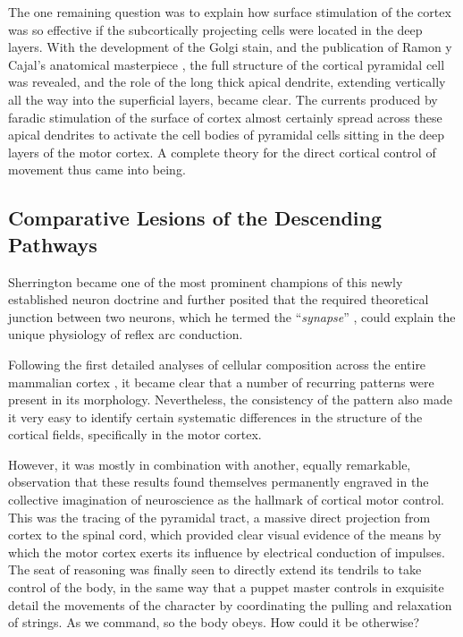The one remaining question was to explain how surface stimulation of the cortex was so effective if the subcortically projecting cells were located in the deep layers. With the development of the Golgi stain, and the publication of Ramon y Cajal's anatomical masterpiece \cite{RamonYCajal1894}, the full structure of the cortical pyramidal cell was revealed, and the role of the long thick apical dendrite, extending vertically all the way into the superficial layers, became clear. The currents produced by faradic stimulation of the surface of cortex almost certainly spread across these apical dendrites to activate the cell bodies of pyramidal cells sitting in the deep layers of the motor cortex. A complete theory for the direct cortical control of movement thus came into being.

\subsection{Comparative Lesions of the Descending Pathways}



Sherrington became one of the most prominent champions of this newly established neuron doctrine and further posited that the required theoretical junction between two neurons, which he termed the ``\emph{synapse}'' \cite{Foster1897}, could explain the unique physiology of reflex arc conduction.

Following the first detailed analyses of cellular composition across the entire mammalian cortex \cite{Campbell1905,Brodmann1909}, it became clear that a number of recurring patterns were present in its morphology. Nevertheless, the consistency of the pattern also made it very easy to identify certain systematic differences in the structure of the cortical fields, specifically in the motor cortex.

However, it was mostly in combination with another, equally remarkable, observation that these results found themselves permanently engraved in the collective imagination of neuroscience as the hallmark of cortical motor control. This was the tracing of the pyramidal tract, a massive direct projection from cortex to the spinal cord, which provided clear visual evidence of the means by which the motor cortex exerts its influence by electrical conduction of impulses. The seat of reasoning was finally seen to directly extend its tendrils to take control of the body, in the same way that a puppet master controls in exquisite detail the movements of the character by coordinating the pulling and relaxation of strings. As we command, so the body obeys. How could it be otherwise?

